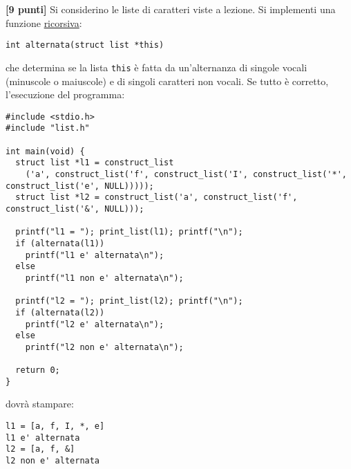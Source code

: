 \documentclass{article}[10pt]
\newcounter{esnu}
\newenvironment{esercizio}{\medskip \noindent {\bf Esercizio\addtocounter{esnu}{1} \arabic{esnu}}}{}
\begin{document}
\begin{esercizio}
\textbf{[9 punti]}
Si considerino le liste di caratteri viste a lezione. Si implementi una funzione \underline{ricorsiva}:
\begin{verbatim}
int alternata(struct list *this)
\end{verbatim}
che determina se la lista \texttt{this} \`e fatta da un'alternanza di singole vocali (minuscole o
maiuscole) e di singoli caratteri non vocali. Se tutto \`e corretto, l'esecuzione del programma:

{\small
\begin{verbatim}
#include <stdio.h>
#include "list.h"

int main(void) {
  struct list *l1 = construct_list
    ('a', construct_list('f', construct_list('I', construct_list('*', construct_list('e', NULL)))));
  struct list *l2 = construct_list('a', construct_list('f', construct_list('&', NULL)));

  printf("l1 = "); print_list(l1); printf("\n");
  if (alternata(l1))
    printf("l1 e' alternata\n");
  else
    printf("l1 non e' alternata\n");

  printf("l2 = "); print_list(l2); printf("\n");
  if (alternata(l2))
    printf("l2 e' alternata\n");
  else
    printf("l2 non e' alternata\n");

  return 0;
}
\end{verbatim}
}
\noindent
dovr\`a stampare:

{\small
\begin{verbatim}
l1 = [a, f, I, *, e]
l1 e' alternata
l2 = [a, f, &]
l2 non e' alternata
\end{verbatim}
}
%
\end{esercizio}
\end{document}
